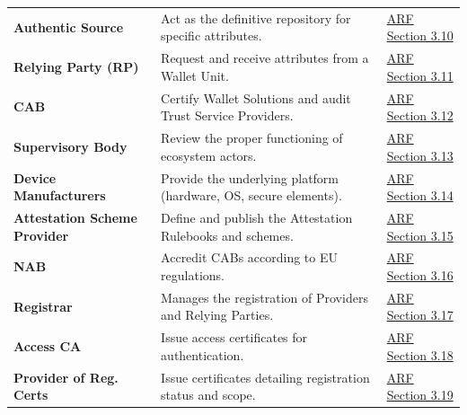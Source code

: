 \documentclass[binding=0.6cm,oneside,noexaminfo]{sapthesis}
\begin{document}
\begin{table}[htbp]
\begin{tabularx}{\textwidth}{@{}l L l@{}}
        \textbf{Authentic Source} & Act as the definitive repository for specific attributes. & \href{https://eudi.dev/latest/architecture-and-reference-framework-main/\#310-authentic-sources}{ARF Section 3.10} \\
        \textbf{Relying Party (RP)} & Request and receive attributes from a Wallet Unit. & \href{https://eudi.dev/latest/architecture-and-reference-framework-main/\#311-relying-parties-relying-party-instances-and-intermediaries}{ARF Section 3.11} \\
        \textbf{CAB} & Certify Wallet Solutions and audit Trust Service Providers. & \href{https://eudi.dev/latest/architecture-and-reference-framework-main/\#312-conformity-assessment-bodies-cab}{ARF Section 3.12} \\
        \textbf{Supervisory Body} & Review the proper functioning of ecosystem actors. & \href{https://eudi.dev/latest/architecture-and-reference-framework-main/\#313-supervisory-bodies}{ARF Section 3.13} \\
        \textbf{Device Manufacturers} & Provide the underlying platform (hardware, OS, secure elements). & \href{https://eudi.dev/latest/architecture-and-reference-framework-main/\#314-device-manufacturers-and-related-subsystems-providers}{ARF Section 3.14} \\
        \textbf{Attestation Scheme Provider} & Define and publish the Attestation Rulebooks and schemes. & \href{https://eudi.dev/latest/architecture-and-reference-framework-main/\#315-attestation-scheme-providers-for-qeaas-pub-eaas-and-eaas}{ARF Section 3.15} \\
        \textbf{NAB} & Accredit CABs according to EU regulations. & \href{https://eudi.dev/latest/architecture-and-reference-framework-main/\#316-national-accreditation-bodies}{ARF Section 3.16} \\
        \textbf{Registrar} & Manages the registration of Providers and Relying Parties. & \href{https://eudi.dev/latest/architecture-and-reference-framework-main/\#317-registrars}{ARF Section 3.17} \\
        \textbf{Access CA} & Issue access certificates for authentication. & \href{https://eudi.dev/latest/architecture-and-reference-framework-main/\#318-access-certificate-authorities}{ARF Section 3.18} \\
        \textbf{Provider of Reg. Certs} & Issue certificates detailing registration status and scope. & \href{https://eudi.dev/latest/architecture-and-reference-framework-main/\#319-providers-of-registration-certificates}{ARF Section 3.19} \\
        \bottomrule
    \end{tabularx}
\end{table}
\end{document}
